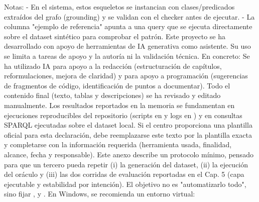 {}Notas: - En el sistema, estos esqueletos se instancian con clases/predicados extraídos del grafo (grounding) y se validan con el checker antes de ejecutar. - La columna "ejemplo de referencia" apunta a una query que se ejecuta directamente sobre el dataset sintético para comprobar el patrón.\markdownRendererInterblockSeparator
{}\markdownRendererInterblockSeparator
{}Este proyecto se ha desarrollado con apoyo de herramientas de IA generativa como asistente. Su uso se limita a tareas de apoyo y  la autoría ni la validación técnica. En concreto:\markdownRendererInterblockSeparator
{}\markdownRendererUlBeginTight
\markdownRendererUlItem Se ha utilizado IA para apoyo a la redacción (estructuración de capítulos, reformulaciones, mejora de claridad) y para apoyo a programación (sugerencias de fragmentos de código, identificación de puntos a documentar).\markdownRendererUlItemEnd 
\markdownRendererUlItem Todo el contenido final (texto, tablas y descripciones) se ha revisado y editado manualmente.\markdownRendererUlItemEnd 
\markdownRendererUlItem Los resultados reportados en la memoria se fundamentan en ejecuciones reproducibles del repositorio (scripts en  y logs en ) y en consultas SPARQL ejecutadas sobre el dataset local.\markdownRendererUlItemEnd 
\markdownRendererUlEndTight \markdownRendererInterblockSeparator
{}Si el centro proporciona una plantilla oficial para esta declaración, debe reemplazarse este texto por la plantilla exacta y completarse con la información requerida (herramienta usada, finalidad, alcance, fecha y responsable).\markdownRendererInterblockSeparator
{}\markdownRendererInterblockSeparator
{}Este anexo describe un protocolo mínimo, pensado para que un tercero pueda repetir (i) la generación del dataset, (ii) la ejecución del oráculo y (iii) las dos corridas de evaluación reportadas en el Cap. 5 (capa ejecutable y estabilidad por intención). El objetivo no es "automatizarlo todo", sino fijar ,  y .\markdownRendererInterblockSeparator
{}\markdownRendererInterblockSeparator
{}En Windows, se recomienda un entorno virtual:\markdownRendererInterblockSeparator
